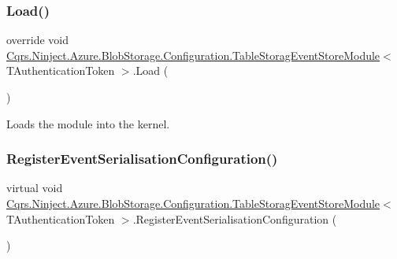\subsubsection{\texorpdfstring{Load()}{Load()}}
{\footnotesize\ttfamily override void \hyperlink{classCqrs_1_1Ninject_1_1Azure_1_1BlobStorage_1_1Configuration_1_1TableStoragEventStoreModule}{Cqrs.\+Ninject.\+Azure.\+Blob\+Storage.\+Configuration.\+Table\+Storag\+Event\+Store\+Module}$<$ T\+Authentication\+Token $>$.Load (\begin{DoxyParamCaption}{ }\end{DoxyParamCaption})}



Loads the module into the kernel. 

\mbox{\label{classCqrs_1_1Ninject_1_1Azure_1_1BlobStorage_1_1Configuration_1_1TableStoragEventStoreModule_a01e4cd605fe9df419f99732e6fde48ac_a01e4cd605fe9df419f99732e6fde48ac}} 
\subsubsection{\texorpdfstring{Register\+Event\+Serialisation\+Configuration()}{RegisterEventSerialisationConfiguration()}}
{\footnotesize\ttfamily virtual void \hyperlink{classCqrs_1_1Ninject_1_1Azure_1_1BlobStorage_1_1Configuration_1_1TableStoragEventStoreModule}{Cqrs.\+Ninject.\+Azure.\+Blob\+Storage.\+Configuration.\+Table\+Storag\+Event\+Store\+Module}$<$ T\+Authentication\+Token $>$.Register\+Event\+Serialisation\+Configuration (\begin{DoxyParamCaption}{ }\end{DoxyParamCaption})\hspace{0.3cm}{\ttfamily [virtual]}}



